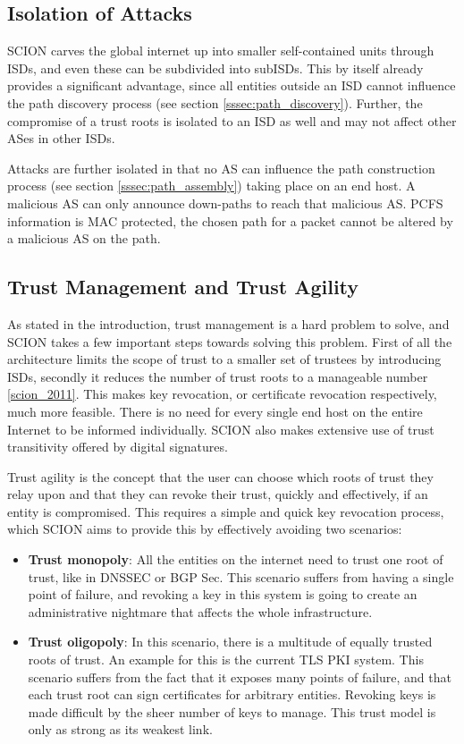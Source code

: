 \documentclass[../eva1_scion.tex]{subfiles}
\begin{document}
    \subsection{Isolation of Attacks}
    SCION carves the global internet up into smaller self-contained units through ISDs, and even these can be subdivided  into  subISDs. This by itself already provides a significant advantage, since all entities outside an ISD cannot influence the path discovery process (see section \ref{sssec:path_discovery}). Further, the compromise of a trust roots is isolated to an ISD as well and may not affect other ASes in other ISDs.

    Attacks are further isolated in that no AS can influence the path construction process (see section \ref{sssec:path_assembly}) taking place on an end host. A malicious AS can only announce down-paths to reach that malicious AS. PCFS information is MAC protected, the chosen path for a packet cannot be altered by a malicious AS on the path. 

    \subsection{Trust Management and Trust Agility}
    As stated in the introduction, trust management is a hard problem to solve, and SCION takes a few important steps towards solving this problem. First of all the architecture limits the scope of trust to a smaller set of trustees by introducing ISDs, secondly it reduces the number of trust roots to a manageable number \ref{scion_2011}. This makes key revocation, or certificate revocation respectively, much more feasible.  There is no need for every single end host on the entire Internet to be informed individually. SCION also makes extensive use of trust transitivity offered by digital signatures.

    Trust agility is the concept that the user can choose which roots of trust they relay upon and that they can revoke their trust, quickly and effectively, if an entity is compromised. This requires a simple and quick key revocation process, which SCION aims to provide this by effectively avoiding two scenarios:

    \begin{itemize}
        \item \textbf{Trust monopoly}: All the entities on the internet need to trust one root of trust, like in DNSSEC or BGP Sec. This scenario suffers from having a single point of failure, and revoking a key in this system is going to create an administrative nightmare that affects the whole infrastructure.
        \item  \textbf{Trust oligopoly}: In this scenario, there is a multitude of equally trusted roots of trust. An example for this is the current  TLS PKI system. This scenario suffers from the fact that it exposes many points of failure, and that each trust root can sign certificates for arbitrary entities. Revoking keys is made difficult by the sheer number of keys to manage. This trust model is only as strong as its weakest link.
    \end{itemize}
\end{document}
